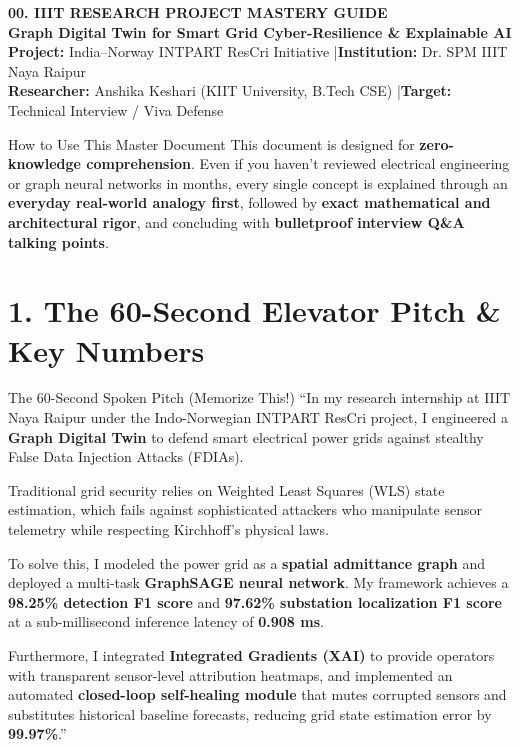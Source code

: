 \documentclass[10pt,a4paper]{article}
\begin{document}
\begin{center}
    {\Huge \textbf{\color{primary}00. IIIT RESEARCH PROJECT MASTERY GUIDE}}\\[5pt]
    {\Large \textbf{\color{secondary}Graph Digital Twin for Smart Grid Cyber-Resilience \& Explainable AI}}\\[4pt]
    \textbf{Project:} India--Norway INTPART ResCri Initiative \quad|\quad \textbf{Institution:} Dr. SPM IIIT Naya Raipur\\[2pt]
    \textbf{Researcher:} Anshika Keshari (KIIT University, B.Tech CSE) \quad|\quad \textbf{Target:} Technical Interview / Viva Defense
\end{center}

\vspace{0.2cm}

\begin{calloutbox}{How to Use This Master Document}
This document is designed for \textbf{zero-knowledge comprehension}. Even if you haven't reviewed electrical engineering or graph neural networks in months, every single concept is explained through an \textbf{everyday real-world analogy first}, followed by \textbf{exact mathematical and architectural rigor}, and concluding with \textbf{bulletproof interview Q\&A talking points}.
\end{calloutbox}

\section{1. The 60-Second Elevator Pitch \& Key Numbers}

\begin{analogybox}{The 60-Second Spoken Pitch (Memorize This!)}
``In my research internship at IIIT Naya Raipur under the Indo-Norwegian INTPART ResCri project, I engineered a \textbf{Graph Digital Twin} to defend smart electrical power grids against stealthy False Data Injection Attacks (FDIAs). 

Traditional grid security relies on Weighted Least Squares (WLS) state estimation, which fails against sophisticated attackers who manipulate sensor telemetry while respecting Kirchhoff's physical laws. 

To solve this, I modeled the power grid as a \textbf{spatial admittance graph} and deployed a multi-task \textbf{GraphSAGE neural network}. My framework achieves a \textbf{98.25\% detection F1 score} and \textbf{97.62\% substation localization F1 score} at a sub-millisecond inference latency of \textbf{0.908 ms}. 

Furthermore, I integrated \textbf{Integrated Gradients (XAI)} to provide operators with transparent sensor-level attribution heatmaps, and implemented an automated \textbf{closed-loop self-healing module} that mutes corrupted sensors and substitutes historical baseline forecasts, reducing grid state estimation error by \textbf{99.97\%}.''
\end{analogybox}
\end{document}
